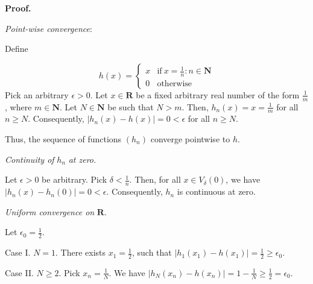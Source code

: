 \documentclass[10pt]{article}
\begin{document}
\textbf{Proof.}



\textit{Point-wise convergence}:



Define




\begin{equation*}
h( x) =\begin{cases}
x & \text{if} \ x=\frac{1}{n} :n\in \mathbf{N}\\
0 & \text{otherwise}
\end{cases}
\end{equation*}
Pick an arbitrary $\displaystyle \epsilon  >0$. Let $\displaystyle x\in \mathbf{R}$ be a fixed arbitrary real number of the form $\displaystyle \frac{1}{m}$, where $\displaystyle m\in \mathbf{N}$. Let $\displaystyle N\in \mathbf{N}$ be such that $\displaystyle N >m$. Then, $\displaystyle h_{n}( x) =x=\frac{1}{m}$ for all $\displaystyle n\geq N$. Consequently, $\displaystyle |h_{n}( x) -h( x) |=0< \epsilon $ for all $\displaystyle n\geq N$.



Thus, the sequence of functions $\displaystyle ( h_{n})$ converge pointwise to $\displaystyle h$.



\textit{Continuity of }$\displaystyle h_{n}$\textit{ at zero.}



Let $\displaystyle \epsilon  >0$ be arbitrary. Pick $\displaystyle \delta < \frac{1}{n}$. Then, for all $\displaystyle x\in V_{\delta }( 0)$, we have $\displaystyle |h_{n}( x) -h_{n}( 0) |=0< \epsilon $. Consequently, $\displaystyle h_{n}$ is continuous at zero.



\textit{Uniform convergence on }$\displaystyle \mathbf{R}$. 



Let $\displaystyle \epsilon _{0} =\frac{1}{2}$. 



Case I. $\displaystyle N=1$. There exists $\displaystyle x_{1} =\frac{1}{2}$, such that $\displaystyle |h_{1}( x_{1}) -h( x_{1}) |=\frac{1}{2} \geq \epsilon _{0}$.



Case II. $\displaystyle N\geq 2$. Pick $\displaystyle x_{n} =\frac{1}{N}$. We have $\displaystyle |h_{N}( x_{n}) -h( x_{n}) |=1-\frac{1}{N} \geq \frac{1}{2} =\epsilon _{0}$.
\end{document}

